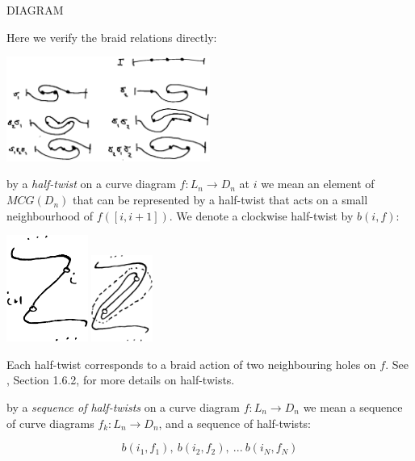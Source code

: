 \documentclass[12pt,a4paper]{article}
\begin{document}
DIAGRAM

Here we verify the braid relations directly:

\begin{center}
\includegraphics[width=0.5\textwidth]{curve-braid.eps}
\end{center}



 by a {\it half-twist} on a curve
diagram $f:L_n\to D_n$ at $i$ we mean an element of $MCG(D_n)$
that can be represented by a half-twist that acts
on a small neighbourhood of $f([i, i+1]).$
We denote a clockwise half-twist by $b(i, f):$

\begin{center}
\includegraphics[width=0.2\textwidth]{halftwist-1.eps}
\includegraphics[width=0.15\textwidth]{halftwist-2.eps}
\end{center}

Each half-twist corresponds to a braid action of two neighbouring
holes on $f$.
See \cite{Kassel10}, Section 1.6.2, for more details on half-twists.

 by a {\it sequence of half-twists} on a curve
diagram $f:L_n\to D_n$ we mean a
sequence of curve diagrams $f_k: L_n\to D_n$, and a sequence of half-twists:

        $$ b(i_1, f_1),\ b(i_2, f_2),\ ...\ b(i_N, f_N) $$
\end{document}

